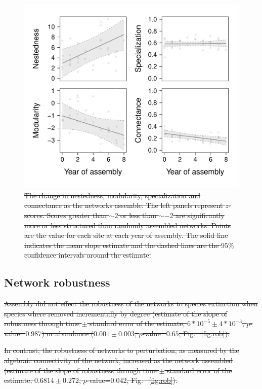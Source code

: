 \documentclass[12pt]{article}
\providecommand{\DIFaddtex}[1]{{\protect\color{blue}\uwave{#1}}} %
\providecommand{\DIFdeltex}[1]{{\protect\color{red}\sout{#1}}}                      %
\providecommand{\DIFdelbegin}{} %
\providecommand{\DIFdelend}{} %
\providecommand{\DIFaddFL}[1]{\DIFadd{#1}} %
\providecommand{\DIFdelFL}[1]{\DIFdel{#1}} %
\providecommand{\DIFaddbeginFL}{} %
\providecommand{\DIFaddendFL}{} %
\providecommand{\DIFdelbeginFL}{} %
\providecommand{\DIFdelendFL}{} %
\providecommand{\DIFadd}[1]{\texorpdfstring{\DIFaddtex{#1}}{#1}} %
\providecommand{\DIFdel}[1]{\texorpdfstring{\DIFdeltex{#1}}{}} %
\begin{document}
\begin{figure}
  \centering
  \DIFdelbeginFL %
\DIFdelendFL \DIFaddbeginFL \includegraphics[width=.4\textwidth]{../analysis/networkLevel/figures/baci.pdf}
  \DIFaddendFL \caption{\DIFdelbeginFL \DIFdelFL{The change in nestedness, modularity, specialization and
    connectance as the networks assemble. The left panels represent
    $z$-scores. Scores greater than $\sim 2$ or less than $\sim -2$
    are significantly more or less structured than randomly assembled
    networks. Points are the value for each site at each year of
    assembly. The solid line indicates the mean slope estimate and the
    dashed lines are the $95\%$ confidence intervals around the
    estimate.}\DIFdelendFL \DIFaddbeginFL \DIFaddFL{XXX}\DIFaddendFL }
  \label{fig:baci}
\end{figure}
\clearpage

\subsection*{Network robustness}
\DIFdelbegin \DIFdel{Assembly did not effect the robustness of the networks to species
extinction when species where removed incrementally by degree
(estimate of the slope of robustness through time $\pm$ standard error
of the estimate, $6*10^{-5} \pm 4*10^{-3}$, $p$-value=$0.987$) or
abundance ($0.001 \pm 0.003$, $p$-value=$0.65$, Fig.~ \ref{fig:rob}).
}\DIFdelend 

\DIFdelbegin \DIFdel{In contrast, the robustness of networks to perturbation, as measured
by the algebraic connectivity of the network, increased as the network
assembled (estimate of the slope of robustness through time $\pm$
standard error of the estimate, $0.6814 \pm 0.272$, $p$-value=$0.042$,
Fig.~ \ref{fig:rob}).
}\DIFdelend %
\end{document}
